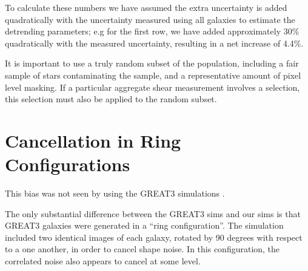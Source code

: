 \documentclass[usegraphicx,usenatbib]{mn2e}
\begin{document}
To calculate these numbers we have assumed the extra uncertainty is added
quadratically with the uncertainty measured using all galaxies to estimate the
detrending parameters; e.g for the first row, we have added approximately 30\%
quadratically with the measured uncertainty, resulting in a net increase of
4.4\%.

It is important to use a truly random subset of the population, including a
fair sample of stars contaminating the sample, and a representative amount of
pixel level masking.  If a particular aggregate shear measurement involves a
selection, this selection must also be applied to the random subset.

\section{Cancellation in Ring Configurations}

This bias was not seen by \cite{HuffMcal} using the GREAT3 simulations
\citep{great3}.

The only substantial difference between the GREAT3 sims and our sims is that
GREAT3 galaxies were generated in a ``ring configuration''.  The simulation
included two identical images of each galaxy, rotated by 90 degrees with
respect to a one another, in order to cancel shape noise.  In this configuration,
the correlated noise also appears to cancel at some level.
\end{document}
